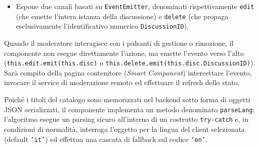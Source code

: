 \documentclass[11pt,a4paper]{article}
\begin{document}
\begin{itemize}
\begin{itemize}
        \item Espone due canali basati su \texttt{EventEmitter}, denominati rispettivamente \texttt{edit} (che emette l'intera istanza della discussione) e \texttt{delete} (che propaga esclusivamente l'identificativo numerico \texttt{DiscussionID}).
    \end{itemize}
    Quando il moderatore interagisce con i pulsanti di gestione o rimozione, il componente non esegue direttamente l'azione, ma emette l'evento verso l'alto (\texttt{this.edit.emit(this.disc)} o \texttt{this.delete.emit(this.disc.DiscussionID)}). Sarà compito della pagina contenitore (\textit{Smart Component}) intercettare l'evento, invocare il service di moderazione remoto ed effettuare il refresh dello stato.
    
    Poiché i titoli del catalogo sono memorizzati nel backend sotto forma di oggetti JSON serializzati, il componente implementa un metodo denominato \texttt{parseLang}: l'algoritmo esegue un parsing sicuro all'interno di un costrutto \texttt{try-catch} e, in condizioni di normalità, interroga l'oggetto per la lingua del client selezionata (default \texttt{'it'}) ed effettua una cascata di fallback sul codice \texttt{'en'}.
    

\end{itemize}
\end{document}
